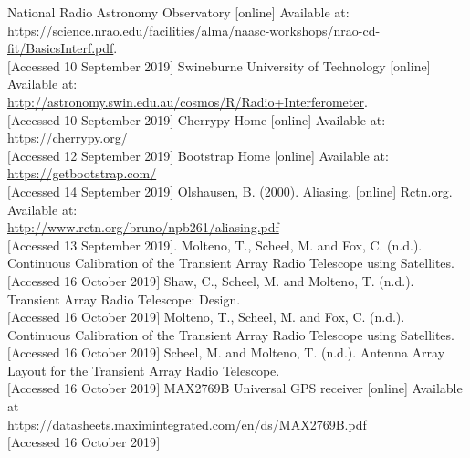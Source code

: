 \newpage
\begin{thebibliography}{9}
National Radio Astronomy Observatory [online] Available at:\\
\url{https://science.nrao.edu/facilities/alma/naasc-workshops/nrao-cd-fit/BasicsInterf.pdf}. \\
$[$Accessed 10 September 2019$]$
Swineburne University of Technology [online] Available at:\\
\url{http://astronomy.swin.edu.au/cosmos/R/Radio+Interferometer}. \\
$[$Accessed 10 September 2019$]$
Cherrypy Home [online] Available at:\\
\url{https://cherrypy.org/}\\
$[$Accessed 12 September 2019$]$
Bootstrap Home [online] Available at:\\
\url{https://getbootstrap.com/}\\
$[$Accessed 14 September 2019$]$
Olshausen, B. (2000). Aliasing. [online] Rctn.org. Available at:\\
\url{http://www.rctn.org/bruno/npb261/aliasing.pdf}\\
$[$Accessed 13 September 2019$]$.
Molteno, T., Scheel, M. and Fox, C. (n.d.). Continuous Calibration of the Transient Array Radio Telescope using Satellites.\\
$[$Accessed 16 October 2019$]$
Shaw, C., Scheel, M. and Molteno, T. (n.d.). Transient Array Radio Telescope: Design.\\
$[$Accessed 16 October 2019$]$
Molteno, T., Scheel, M. and Fox, C. (n.d.). Continuous Calibration of the Transient Array Radio Telescope using Satellites.\\
$[$Accessed 16 October 2019$]$
Scheel, M. and Molteno, T. (n.d.). Antenna Array Layout for the Transient Array Radio Telescope.\\
$[$Accessed 16 October 2019$]$
MAX2769B Universal GPS receiver [online] Available at\\
\url{https://datasheets.maximintegrated.com/en/ds/MAX2769B.pdf}\\
$[$Accessed 16 October 2019$]$

\end{thebibliography}
